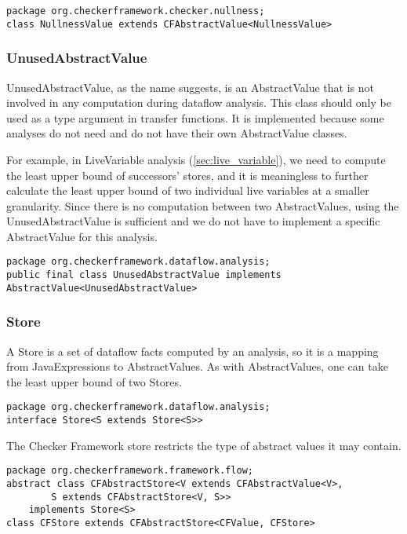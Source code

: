 \begin{verbatim}
package org.checkerframework.checker.nullness;
class NullnessValue extends CFAbstractValue<NullnessValue>
\end{verbatim}

\subsubsection{UnusedAbstractValue}
\label{sec:unused_abstract_value_class}

UnusedAbstractValue, as the name suggests, is an AbstractValue that is
not involved in any computation during dataflow analysis. This class should
only be used as a type argument in transfer functions. It is implemented because some
analyses do not need and do not have their own AbstractValue classes.

For example, in LiveVariable analysis (\autoref{sec:live_variable}),
we need to compute the least upper bound of successors' stores, and
it is meaningless to further calculate the least upper bound of two
individual live variables at a smaller granularity.
Since there is no computation between two AbstractValues, using the UnusedAbstractValue
is sufficient and we do not have to implement a specific AbstractValue for this analysis.

\begin{verbatim}
package org.checkerframework.dataflow.analysis;
public final class UnusedAbstractValue implements AbstractValue<UnusedAbstractValue>
\end{verbatim}

\subsubsection{Store}
\label{sec:store_classes}

A Store is a set of dataflow facts computed by an analysis, so it is a
mapping from JavaExpressions to AbstractValues.  As with
AbstractValues, one can take the least upper bound of two Stores.

\begin{verbatim}
package org.checkerframework.dataflow.analysis;
interface Store<S extends Store<S>>
\end{verbatim}

The Checker Framework store restricts the type of abstract values it
may contain.

\begin{verbatim}
package org.checkerframework.framework.flow;
abstract class CFAbstractStore<V extends CFAbstractValue<V>,
        S extends CFAbstractStore<V, S>>
    implements Store<S>
class CFStore extends CFAbstractStore<CFValue, CFStore>
\end{verbatim}


